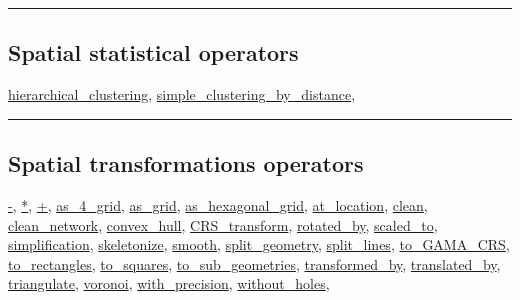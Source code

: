 \documentclass[]{book}
\theoremstyle{definition}
\theoremstyle{definition}
\theoremstyle{definition}
\theoremstyle{remark}
\begin{document}
\begin{center}\rule{0.5\linewidth}{\linethickness}\end{center}

\subsection{Spatial statistical
operators}\label{spatial-statistical-operators}

\href{operators-d-to-h.html\#hierarchical_clustering}{hierarchical\_clustering},
\href{operators-s-to-z.html\#simple_clustering_by_distance}{simple\_clustering\_by\_distance},

\begin{center}\rule{0.5\linewidth}{\linethickness}\end{center}

\subsection{Spatial transformations
operators}\label{spatial-transformations-operators}

\href{operators-a-to-a.html\#-}{-}, \href{operators-a-to-a.html\#*}{*},
\href{operators-a-to-a.html\#+}{+},
\href{operators-a-to-a.html\#as_4_grid}{as\_4\_grid},
\href{operators-a-to-a.html\#as_grid}{as\_grid},
\href{operators-a-to-a.html\#as_hexagonal_grid}{as\_hexagonal\_grid},
\href{operators-a-to-a.html\#at_location}{at\_location},
\href{operators-b-to-c.html\#clean}{clean},
\href{operators-b-to-c.html\#clean_network}{clean\_network},
\href{operators-b-to-c.html\#convex_hull}{convex\_hull},
\href{operators-b-to-c.html\#crs_transform}{CRS\_transform},
\href{operators-n-to-r.html\#rotated_by}{rotated\_by},
\href{operators-s-to-z.html\#scaled_to}{scaled\_to},
\href{operators-s-to-z.html\#simplification}{simplification},
\href{operators-s-to-z.html\#skeletonize}{skeletonize},
\href{operators-s-to-z.html\#smooth}{smooth},
\href{operators-s-to-z.html\#split_geometry}{split\_geometry},
\href{operators-s-to-z.html\#split_lines}{split\_lines},
\href{operators-s-to-z.html\#to_gama_crs}{to\_GAMA\_CRS},
\href{operators-s-to-z.html\#to_rectangles}{to\_rectangles},
\href{operators-s-to-z.html\#to_squares}{to\_squares},
\href{operators-s-to-z.html\#to_sub_geometries}{to\_sub\_geometries},
\href{operators-s-to-z.html\#transformed_by}{transformed\_by},
\href{operators-s-to-z.html\#translated_by}{translated\_by},
\href{operators-s-to-z.html\#triangulate}{triangulate},
\href{operators-s-to-z.html\#voronoi}{voronoi},
\href{operators-s-to-z.html\#with_precision}{with\_precision},
\href{operators-s-to-z.html\#without_holes}{without\_holes},
\end{document}
